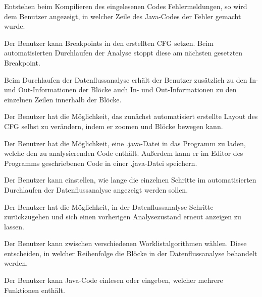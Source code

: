 Entstehen beim Kompilieren des eingelesenen Codes Fehlermeldungen, so wird dem Benutzer angezeigt, in welcher Zeile des Java-Codes der Fehler gemacht wurde.

Der Benutzer kann Breakpoints in den erstellten CFG setzen. Beim automatisierten Durchlaufen der Analyse stoppt diese am nächsten gesetzten Breakpoint.

Beim Durchlaufen der Datenflussanalyse erhält der Benutzer zusätzlich zu den In- und Out-Informationen der Blöcke auch In- und Out-Informationen zu den einzelnen Zeilen innerhalb der Blöcke.

Der Benutzer hat die Möglichkeit, das zunächst automatisiert erstellte Layout des CFG selbst zu verändern, indem er zoomen und Blöcke bewegen kann.

Der Benutzer hat die Möglichkeit, eine .java-Datei in das Programm zu laden, welche
den zu analysierenden Code enthält. Außerdem kann er im Editor des Programms geschriebenen Code in einer .java-Datei speichern.

Der Benutzer kann einstellen, wie lange die einzelnen Schritte im automatisierten
Durchlaufen der Datenflussanalyse angezeigt werden sollen.

Der Benutzer hat die Möglichkeit, in der Datenflussanalyse Schritte zurückzugehen und sich einen vorherigen Analysezustand erneut anzeigen zu lassen.

Der Benutzer kann zwischen verschiedenen Worklistalgorithmen wählen. Diese
entscheiden, in welcher Reihenfolge die Blöcke in der Datenflussanalyse behandelt
werden.

Der Benutzer kann Java-Code einlesen oder eingeben, welcher mehrere Funktionen
enthält.

